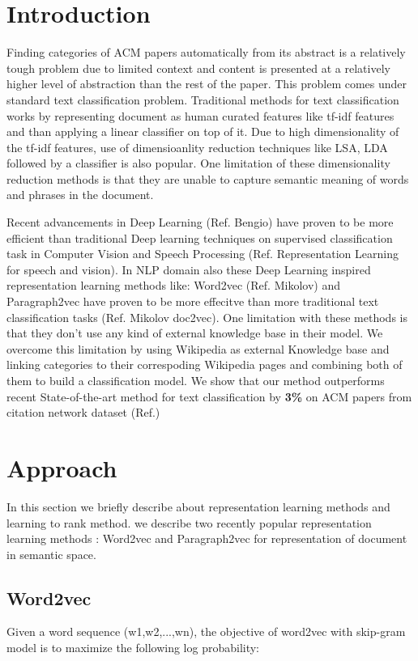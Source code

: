 \documentclass[runningheads,a4paper]{llncs}
\begin{document}
\section{Introduction}
Finding categories of ACM papers automatically from its abstract is a relatively tough problem due to limited context and content is presented at a relatively higher level of abstraction than the rest of the paper. This problem comes under standard text classification problem. Traditional methods for text classification works by representing document as human curated features like tf-idf features and than applying a linear classifier on top of it. Due to high dimensionality of the tf-idf features, use of dimensioanlity reduction techniques like LSA, LDA followed by a classifier is also popular. One limitation of these dimensionality reduction methods is that they are unable to capture semantic meaning of words and phrases in the document.
 
Recent advancements in Deep Learning (Ref. Bengio) have proven to be more efficient than traditional Deep learning techniques on supervised classification task in Computer Vision and Speech Processing (Ref. Representation Learning for speech and vision). In NLP domain also these Deep Learning inspired representation learning methods like: Word2vec (Ref. Mikolov) and Paragraph2vec have proven to be more effecitve than more traditional text classification tasks (Ref. Mikolov doc2vec). One limitation with these methods is that they don't use any kind of external knowledge base in their model. We overcome this limitation by using Wikipedia as external Knowledge base and linking categories to their correspoding Wikipedia pages and combining both of them to build a classification model. We show that our method outperforms recent State-of-the-art method for text classification by {\bf 3\%} on ACM papers from citation network dataset (Ref.)

\section{Approach}

In this section we briefly describe about representation learning methods and learning to rank method. we describe two recently popular representation learning methods : Word2vec and Paragraph2vec for representation of document in semantic space. 

\subsection{Word2vec}
Given a word sequence (w1,w2,...,wn), the objective of word2vec with skip-gram model is to maximize the following log probability:
\end{document}
